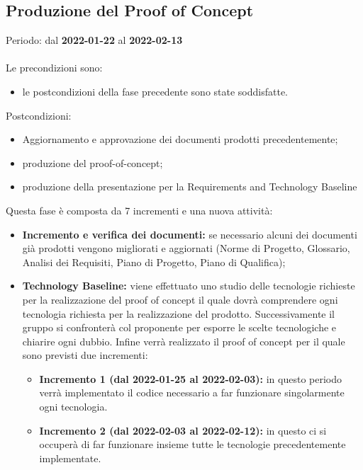 \subsection{Produzione del Proof of Concept}
Periodo: dal \textbf{2022-01-22} al \textbf{2022-02-13}  \mbox{} \\ \mbox{} \\
Le precondizioni sono:
\begin{itemize}
    \item le postcondizioni della fase precedente sono state soddisfatte.
\end{itemize}

Postcondizioni:
\begin{itemize}
    \item Aggiornamento e approvazione dei documenti prodotti precedentemente;
    \item produzione del proof-of-concept;
    \item produzione della presentazione per la Requirements and Technology Baseline
\end{itemize}

Questa fase è composta da 7 incrementi e una nuova attività:
\begin{itemize}
    \item \textbf{Incremento e verifica dei documenti:} se necessario alcuni dei documenti già
    prodotti vengono migliorati e aggiornati (Norme di Progetto, Glossario,
    Analisi dei Requisiti, Piano di Progetto, Piano di Qualifica);
    \item \textbf{Technology Baseline:} viene effettuato uno studio delle tecnologie richieste per la realizzazione del proof of concept il quale dovrà comprendere ogni tecnologia richiesta per la realizzazione del prodotto. Successivamente il gruppo si confronterà col proponente per esporre le scelte tecnologiche e chiarire ogni dubbio. Infine verrà realizzato il proof of concept per il quale sono previsti due incrementi:
    \begin{itemize}
        \item \textbf{Incremento 1 (dal 2022-01-25 al 2022-02-03):} in questo periodo verrà implementato il codice necessario a far funzionare singolarmente ogni tecnologia.
        \item \textbf{Incremento 2 (dal 2022-02-03 al 2022-02-12):} in questo ci si occuperà di far funzionare insieme tutte le tecnologie precedentemente implementate.
    \end{itemize}
\end{itemize}


